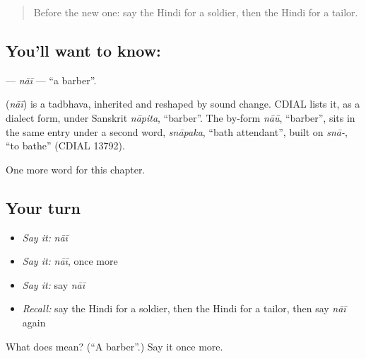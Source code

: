 \label{lesson:HI-C193-nai}



\begin{quote}
Before the new one: say the Hindi for a soldier, then the Hindi for a tailor.
\end{quote}

\subsection*{You'll want to know: }
\textbf{} — \emph{nāī} — \textquotedblleft{}a barber\textquotedblright{}.

\begin{cousinweb}
\textbf{} (\emph{nāī}) is a tadbhava, inherited and reshaped by sound change. CDIAL lists it, as a dialect form, under Sanskrit \emph{nāpita}, \textquotedblleft{}barber\textquotedblright{}. The by-form \emph{nāū}, \textquotedblleft{}barber\textquotedblright{}, sits in the same entry under a second word, \emph{snāpaka}, \textquotedblleft{}bath attendant\textquotedblright{}, built on \emph{snā-}, \textquotedblleft{}to bathe\textquotedblright{} (CDIAL 13792).
\end{cousinweb}

\begin{grammarlens}[title={What you've built}]
One more word for this chapter.
\end{grammarlens}

\subsection*{Your turn}
\begin{itemize}
\raggedright
  \item \emph{Say it:} \emph{nāī}
  \item \emph{Say it:} \emph{nāī}, once more
  \item \emph{Say it:} say \emph{nāī}
  \item \emph{Recall:} say the Hindi for a soldier, then the Hindi for a tailor, then say \emph{nāī} again
\end{itemize}

\begin{tcolorbox}[breakable,colback=teal!4,colframe=teal!35!black,title={Before you move on}]
What does  mean? (\textquotedblleft{}A barber\textquotedblright{}.) Say it once more.
\end{tcolorbox}
